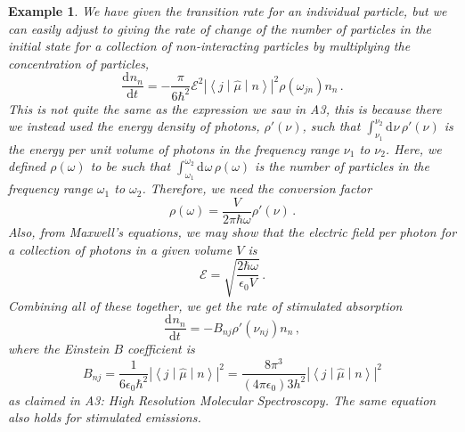 \documentclass{article}
\theoremstyle{plain}\theoremheaderfont{\normalfont\itshape}\theorembodyfont{\rmfamily}\theoremseparator{.}\newtheorem*{rem}{Remark}\newtheorem*{ex}{Example}\newtheorem*{proof}{Proof}\newtheorem*{altp}{Alternative proof}
\theoremstyle{plain}\theoremheaderfont{\normalfont\bfseries}\theorembodyfont{\rmfamily}\theoremseparator{.}\newtheorem{thm}{Theorem}[section]\newtheorem{lem}[thm]{Lemma}\newtheorem{prop}[thm]{Proposition}\newtheorem*{cor}{Corollary}\newtheorem{defn}[thm]{Definition}\newtheorem{clm}[thm]{Claim}\newtheorem{clminproof}{Claim}
\theoremstyle{break}\theoremheaderfont{\normalfont\itshape}\theorembodyfont{\rmfamily}\theoremseparator{.\medskip}\newtheorem*{proofskip}{Proof}\newtheorem*{exs}{Examples}\newtheorem*{rems}{Remarks}
\theoremstyle{break}\theoremheaderfont{\normalfont\bfseries}\theorembodyfont{\rmfamily}\theoremseparator{.\medskip}\newtheorem{lemskip}[thm]{Lemma}\newtheorem{defnskip}[thm]{Definition}\newtheorem{propskip}[thm]{Proposition}\newtheorem{thmskip}[thm]{Theorem}
\numberwithin{equation}{section}
\newcommand{\dd}[2][]{\mathrm{d}^{#1} #2\,}
\newcommand{\dv}[3][]{\frac{\mathrm{d}^{#1} #2}{{\mathrm{d} #3}^{#1}}}
\newcommand{\mel}[3]{\left\langle #1 \middle| #2 \middle| #3 \right\rangle}
\newcommand{\abs}[1]{\left| #1 \right|}
\begin{document}
\begin{ex}
        We have given the transition rate for an individual particle, but we can easily adjust to giving the rate of change of the number of particles in the initial state for a collection of non-interacting particles by multiplying the concentration of particles,
        \begin{equation}
            \dv{n_n}{t}=-\frac{\pi}{6\hbar^2}\mathcal{E}^2\abs{\mel{j}{\hat{\mu}}{n}}^2\rho(\omega_{jn})n_n\,.
        \end{equation}
        This is not quite the same as the expression we saw in A3, this is because there we instead used the energy density of photons, \(\rho'(\nu)\), such that \(\int_{\nu_1}^{\nu_2}\dd{\nu}\rho'(\nu)\) is the energy per unit volume of photons in the frequency range \(\nu_1\) to \(\nu_2\). Here, we defined \(\rho(\omega)\) to be such that \(\int_{\omega_1}^{\omega_2}\dd{\omega}\rho(\omega)\) is the number of particles in the frequency range \(\omega_1\) to \(\omega_2\). Therefore, we need the conversion factor
        \begin{equation}
            \rho(\omega)=\frac{V}{2\pi\hbar\omega}\rho'(\nu)\,.
        \end{equation}
        Also, from Maxwell's equations, we may show that the electric field per photon for a collection of photons in a given volume \(V\) is
        \begin{equation}
            \mathcal{E}=\sqrt{\frac{2\hbar\omega}{\epsilon_0 V}}\,.
        \end{equation}
        Combining all of these together, we get the rate of stimulated absorption
        \begin{equation}
            \dv{n_n}{t}=-B_{nj}\rho'(\nu_{nj})n_n\,,
        \end{equation}
        where the \textit{Einstein \(B\) coefficient is}
        \begin{equation}
            B_{nj}=\frac{1}{6\epsilon_0 \hbar^2}\abs{\mel{j}{\hat{\mu}}{n}}^2=\frac{8\pi^3}{(4\pi\epsilon_0) 3h^2}\abs{\mel{j}{\hat{\mu}}{n}}^2
        \end{equation}
        as claimed in A3: \textit{High Resolution Molecular Spectroscopy}. The same equation also holds for stimulated emissions.
    \end{ex}
\end{document}
